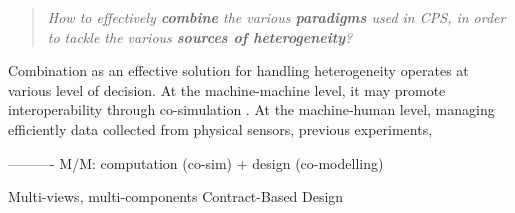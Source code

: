 \begin{quote}
\emph{How to effectively \textbf{combine} the various \textbf{paradigms} used in 
CPS, in order to tackle the various \textbf{sources of heterogeneity}?}
\end{quote}

\noindent
Combination as an effective solution for handling heterogeneity operates at various
level of decision. At the machine-machine level, it may promote interoperability
through co-simulation \cite{J:Gomes-etAl:2018}. At the machine-human level, 
managing efficiently data collected from physical sensors, previous experiments,




----------
M/M: computation (co-sim) + design (co-modelling)

Multi-views, multi-components
Contract-Based Design

